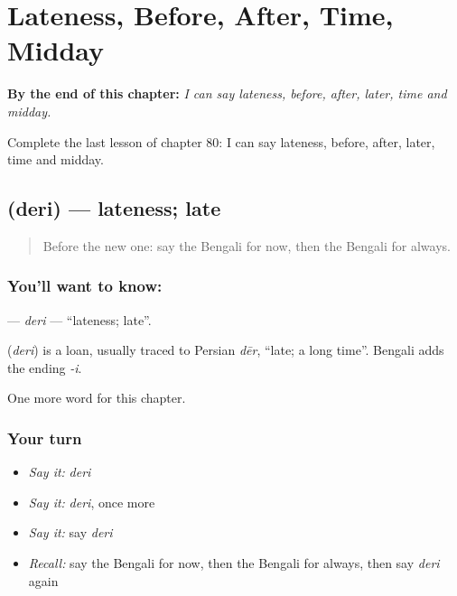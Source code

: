 
\chapter{Lateness, Before, After, Time, Midday}
\label{ch:bn-lateness-before-after-time-midday}

\begin{chapteropening}
\textbf{By the end of this chapter:} \emph{I can say lateness, before, after, later, time and midday.}

Complete the last lesson of chapter 80: I can say lateness, before, after, later, time and midday.
\end{chapteropening}

\section[\texorpdfstring{\bn{দেরি} (deri)}{দেরি (deri)}]{ (deri) — lateness; late}

\label{lesson:BN-C80-deri}



\begin{quote}
Before the new one: say the Bengali for now, then the Bengali for always.
\end{quote}

\subsection*{You'll want to know: }
\textbf{} — \emph{deri} — \textquotedblleft{}lateness; late\textquotedblright{}.

\begin{cousinweb}
\textbf{} (\emph{deri}) is a loan, usually traced to Persian \emph{dēr}, \textquotedblleft{}late; a long time\textquotedblright{}. Bengali adds the ending \emph{-i}.
\end{cousinweb}

\begin{grammarlens}[title={What you've built}]
One more word for this chapter.
\end{grammarlens}

\subsection*{Your turn}
\begin{itemize}
\raggedright
  \item \emph{Say it:} \emph{deri}
  \item \emph{Say it:} \emph{deri}, once more
  \item \emph{Say it:} say \emph{deri}
  \item \emph{Recall:} say the Bengali for now, then the Bengali for always, then say \emph{deri} again
\end{itemize}

